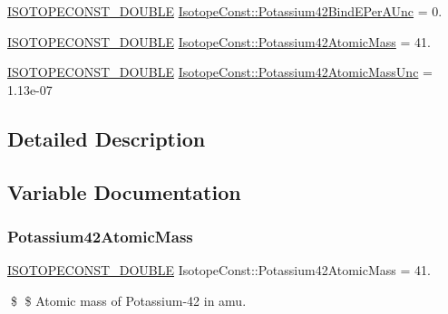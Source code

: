 \begin{DoxyCompactItemize}
\mbox{\hyperlink{group___isotope_const-_macros_ga8f45a7272ce02c0b4c65c44636ed719a}{I\+S\+O\+T\+O\+P\+E\+C\+O\+N\+S\+T\+\_\+\+D\+O\+U\+B\+LE}} \mbox{\hyperlink{group___isotope_const-_potassium-_k42_gae78c2497626c29758345b726d4338031}{Isotope\+Const\+::\+Potassium42\+Bind\+E\+Per\+A\+Unc}} = 0.
\item 
\mbox{\hyperlink{group___isotope_const-_macros_ga8f45a7272ce02c0b4c65c44636ed719a}{I\+S\+O\+T\+O\+P\+E\+C\+O\+N\+S\+T\+\_\+\+D\+O\+U\+B\+LE}} \mbox{\hyperlink{group___isotope_const-_potassium-_k42_ga3e16ddf7948c521ea0d7d75a2ed3c98a}{Isotope\+Const\+::\+Potassium42\+Atomic\+Mass}} = 41.
\item 
\mbox{\hyperlink{group___isotope_const-_macros_ga8f45a7272ce02c0b4c65c44636ed719a}{I\+S\+O\+T\+O\+P\+E\+C\+O\+N\+S\+T\+\_\+\+D\+O\+U\+B\+LE}} \mbox{\hyperlink{group___isotope_const-_potassium-_k42_ga5fe3a58bf0be791b1d762aa1c337fbbe}{Isotope\+Const\+::\+Potassium42\+Atomic\+Mass\+Unc}} = 1.\+13e-\/07
\end{DoxyCompactItemize}


\subsection{Detailed Description}


\subsection{Variable Documentation}
\mbox{\label{group___isotope_const-_potassium-_k42_ga3e16ddf7948c521ea0d7d75a2ed3c98a}} 
\subsubsection{\texorpdfstring{Potassium42\+Atomic\+Mass}{Potassium42AtomicMass}}
{\footnotesize\ttfamily \mbox{\hyperlink{group___isotope_const-_macros_ga8f45a7272ce02c0b4c65c44636ed719a}{I\+S\+O\+T\+O\+P\+E\+C\+O\+N\+S\+T\+\_\+\+D\+O\+U\+B\+LE}} Isotope\+Const\+::\+Potassium42\+Atomic\+Mass = 41.}

\$ \$ Atomic mass of Potassium-\/42 in amu. \mbox{\label{group___isotope_const-_potassium-_k42_ga5fe3a58bf0be791b1d762aa1c337fbbe}} 

